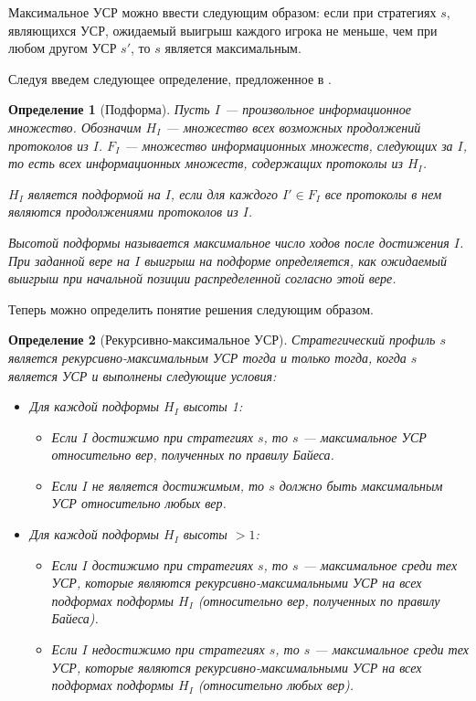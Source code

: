 \documentclass[14pt, a4paper]{extreport}
\newtheorem{definition}{\indent Определение}
\begin{document}
        Максимальное УСР можно ввести следующим образом: если при стратегиях $s$, являющихся УСР, ожидаемый выигрыш каждого игрока не меньше, чем при любом другом УСР $s'$, то $s$ является максимальным.

        Следуя \cite{chen2017noncoop} введем следующее определение, предложенное в \cite{kreps1982sequential}.
        \begin{definition}[Подформа]
            Пусть $I$ --- произвольное информационное множество. Обозначим $H_I$ --- множество всех возможных продолжений протоколов из $I$. $F_I$ --- множество информационных множеств, следующих за $I$, то есть всех информационных множеств, содержащих протоколы из $H_I$.

            $H_I$ является подформой на $I$, если для каждого $I' \in F_I$ все протоколы в нем являются продолжениями протоколов из $I$.

            Высотой подформы называется максимальное число ходов после достижения $I$. При заданной вере на $I$ выигрыш на подформе определяется, как ожидаемый выигрыш при начальной позиции распределенной согласно этой вере.
        \end{definition}

        Теперь можно определить понятие решения следующим образом.

        \begin{definition}[Рекурсивно-максимальное УСР]
            Стратегический профиль $s$ является рекурсивно-максимальным УСР тогда и только тогда, когда $s$ является УСР и выполнены следующие условия:
            \begin{itemize}
                \item Для каждой подформы $H_I$ высоты 1:
                    \begin{itemize}
                        \item Если $I$ достижимо при стратегиях $s$, то $s$ --- максимальное УСР относительно вер, полученных по правилу Байеса.
                        \item Если $I$ не является достижимым, то $s$ должно быть максимальным УСР относительно любых вер.
                    \end{itemize}
                \item Для каждой подформы $H_I$ высоты $>1$:
                    \begin{itemize}
                        \item Если $I$ достижимо при стратегиях $s$, то $s$ --- максимальное среди тех УСР, которые являются рекурсивно-максимальными УСР на всех подформах подформы $H_I$ (относительно вер, полученных по правилу Байеса).
                        \item Если $I$ недостижимо при стратегиях $s$, то $s$ --- максимальное среди тех УСР, которые являются рекурсивно-максимальными УСР на всех подформах подформы $H_I$ (относительно любых вер).
                    \end{itemize}
            \end{itemize}
        \end{definition}
\end{document}
